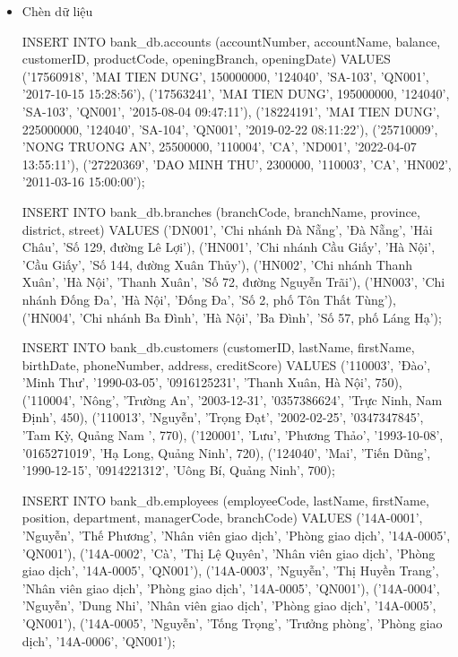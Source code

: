 \begin{itemize}
    \newpage
    
    \item Chèn dữ liệu
    \begin{MySQLCode}
        INSERT INTO bank_db.accounts 
        (accountNumber, accountName, balance, customerID, productCode, openingBranch, openingDate)
        VALUES 
        ('17560918', 'MAI TIEN DUNG', 150000000, '124040', 'SA-103', 'QN001', '2017-10-15 15:28:56'),
        ('17563241', 'MAI TIEN DUNG', 195000000, '124040', 'SA-103', 'QN001', '2015-08-04 09:47:11'),
        ('18224191', 'MAI TIEN DUNG', 225000000, '124040', 'SA-104', 'QN001', '2019-02-22 08:11:22'),
        ('25710009', 'NONG TRUONG AN', 25500000, '110004', 'CA', 'ND001', '2022-04-07 13:55:11'),
        ('27220369', 'DAO MINH THU', 2300000, '110003', 'CA', 'HN002', '2011-03-16 15:00:00');
    \end{MySQLCode}

    \begin{MySQLCode}
        INSERT INTO bank_db.branches
        (branchCode, branchName, province, district, street)
        VALUES  
        ('DN001', 'Chi nhánh Đà Nẵng', 'Đà Nẵng', 'Hải Châu', 'Số 129, đường Lê Lợi'),
        ('HN001', 'Chi nhánh Cầu Giấy', 'Hà Nội', 'Cầu Giấy', 'Số 144, đường Xuân Thủy'),
        ('HN002', 'Chi nhánh Thanh Xuân', 'Hà Nội', 'Thanh Xuân', 'Số 72, đường Nguyễn Trãi'),
        ('HN003', 'Chi nhánh Đống Đa', 'Hà Nội', 'Đống Đa', 'Số 2, phố Tôn Thất Tùng'),
        ('HN004', 'Chi nhánh Ba Đình', 'Hà Nội', 'Ba Đình', 'Số 57, phố Láng Hạ');
    \end{MySQLCode}

    \begin{MySQLCode}
        INSERT INTO bank_db.customers
        (customerID, lastName, firstName, birthDate, phoneNumber, address, creditScore)
        VALUES
        ('110003', 'Đào', 'Minh Thư', '1990-03-05', '0916125231', 'Thanh Xuân, Hà Nội', 750),
        ('110004', 'Nông', 'Trường An', '2003-12-31', '0357386624', 'Trực Ninh, Nam Định', 450),
        ('110013', 'Nguyễn', 'Trọng Đạt', '2002-02-25', '0347347845', 'Tam Kỳ, Quảng Nam ', 770),
        ('120001', 'Lưu', 'Phương Thảo', '1993-10-08', '0165271019', 'Hạ Long, Quảng Ninh', 720),
        ('124040', 'Mai', 'Tiến Dũng', '1990-12-15', '0914221312', 'Uông Bí, Quảng Ninh', 700);
    \end{MySQLCode}

    \begin{MySQLCode}
        INSERT INTO bank_db.employees 
        (employeeCode, lastName, firstName, position, department, managerCode, branchCode)
        VALUES  
        ('14A-0001', 'Nguyễn', 'Thế Phương', 'Nhân viên giao dịch', 'Phòng giao dịch', '14A-0005', 'QN001'),
        ('14A-0002', 'Cà', 'Thị Lệ Quyên', 'Nhân viên giao dịch', 'Phòng giao dịch', '14A-0005', 'QN001'),
        ('14A-0003', 'Nguyễn', 'Thị Huyền Trang', 'Nhân viên giao dịch', 'Phòng giao dịch', '14A-0005', 'QN001'),
        ('14A-0004', 'Nguyễn', 'Dung Nhi', 'Nhân viên giao dịch', 'Phòng giao dịch', '14A-0005', 'QN001'),
        ('14A-0005', 'Nguyễn', 'Tống Trọng', 'Trưởng phòng', 'Phòng giao dịch', '14A-0006', 'QN001');
    \end{MySQLCode}


\end{itemize}
